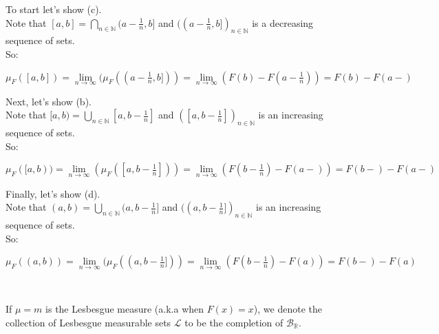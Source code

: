 \documentclass{book}
\newcommand{\hOne}{%
   \color{Black}%
   \fontsize{14}{16}\selectfont%
}
\newcommand{\exTwoP}{%
   \color{RedViolet}%
   \fontsize{13}{15}\selectfont%
}
\newcommand{\exPP}{%
   \color{RedViolet}%
   \fontsize{12}{14}\selectfont%
}
\newenvironment{myIndent}{%
   \begin{adjustwidth}{2.5em}{0em}%
}{%
   \end{adjustwidth}%
}
\newcommand{\mySepTwo}[1][.]{%
   {\noindent\color{#1}{\rule{6.5in}{0.5mm}}}\\%
}
\newcommand{\retTwo}{\hfill\bigbreak}
\begin{document}
\begin{myIndent}\exTwoP
   To start let's show (c).\\ Note that $[a, b] = \bigcap\limits_{n \in \mathbb{N}}(a - \frac{1}{n}, b]$ and $((a - \frac{1}{n}, b])_{n \in \mathbb{N}}$ is a decreasing sequence of sets.\\ [-8pt] So:

   {\centering\exPP $\mu_F([a, b]) = \lim\limits_{n \rightarrow \infty}(\mu_F((a - \frac{1}{n}, b])) = \lim\limits_{n \rightarrow \infty}(F(b) - F(a - \frac{1}{n})) = F(b) - F(a-)$\retTwo\par}

   Next, let's show (b).\\
   Note that $[a, b) = \bigcup\limits_{n \in \mathbb{N}}[a, b - \frac{1}{n}]$ and $([a, b- \frac{1}{n}])_{n \in \mathbb{N}}$ is an increasing sequence of sets.\\ [-8pt] So:

   {\centering\exPP $\mu_F([a, b)) = \lim\limits_{n \rightarrow \infty}(\mu_F([a, b-\frac{1}{n}])) = \lim\limits_{n \rightarrow \infty}(F(b - \frac{1}{n}) - F(a-)) = F(b-) - F(a-)$\retTwo\par}

   Finally, let's show (d).\\
   Note that $(a, b) = \bigcup\limits_{n \in \mathbb{N}}(a, b-\frac{1}{n}]$ and $((a, b- \frac{1}{n}])_{n \in \mathbb{N}}$ is an increasing sequence of sets.\\ [-8pt] So:

   {\centering\exPP $\mu_F((a, b)) = \lim\limits_{n \rightarrow \infty}(\mu_F((a, b-\frac{1}{n}])) = \lim\limits_{n \rightarrow \infty}(F(b - \frac{1}{n}) - F(a)) = F(b-) - F(a)$\retTwo\par}
\end{myIndent}

\mySepTwo\hOne

If $\mu = m$ is the Lesbesgue measure (a.k.a when $F(x) = x$), we denote the collection of Lesbesgue measurable sets $\mathcal{L}$ to be the completion of $\mathcal{B}_\mathbb{R}$.\retTwo
\end{document}
